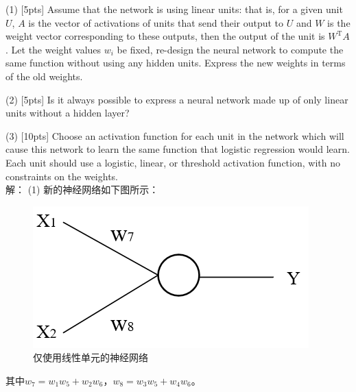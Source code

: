 \documentclass[a4paper,utf8]{article}
\begin{document}
	(1) [5pts] Assume that the network is using linear units: that is, for a given unit $U$, $A$ is the vector of activations of units that send their output to $U$ and $W$ is the weight vector corresponding to these outputs, then the output of the unit is $W^{\mathrm{T}}A$. Let the weight values $w_i$ be fixed, re-design the neural network to compute the same function without using any hidden units. Express the new weights in terms of the old weights.
	
	(2) [5pts] Is it always possible to express a neural network made up of only linear units without a hidden layer?
	
	(3) [10pts] Choose an activation function for each unit in the network which will cause this network to learn the same function that logistic regression would learn. Each unit should use a logistic, linear, or threshold activation function, with no constraints on the weights.
	\\
	
	\noindent 解：
	(1) 新的神经网络如下图所示：
	\begin{figure}[htbp]
		\centering
		\includegraphics[scale=0.7]{p2-nn2.png}
		\caption{仅使用线性单元的神经网络}
	\end{figure}
	
	\noindent 其中$w_7=w_1w_5+w_2w_6$，$w_8=w_3w_5+w_4w_6$。
\end{document}
